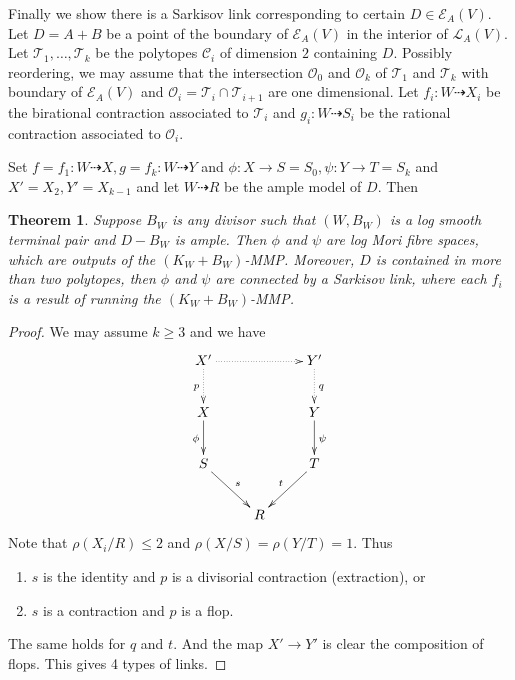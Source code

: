 \documentclass[11pt]{amsart}
\newtheorem{thm}[defn]{Theorem}
\begin{document}
Finally we show there is a Sarkisov link corresponding to certain $D \in \mathcal{E}_{A}(V)$. Let $ D=A+B $ be a point of the boundary of $ \mathcal{E}_A(V) $ in the interior of $ \mathcal{L}_A(V) $. Let $ \mathcal{T}_1, \ldots, \mathcal{T}_k $ be the polytopes $ \mathcal{C}_i $ of dimension $ 2 $ containing $ D $. Possibly reordering, we may assume that  the intersection  $ \mathcal{O}_0 $ and $ \mathcal{O}_k $ of $ \mathcal{T}_1 $ and $ \mathcal{T}_k $ with boundary of $ \mathcal{E}_A(V) $ and  $ \mathcal{O}_i=\mathcal{T}_i\cap\mathcal{T}_{i+1} $ are one dimensional. Let $ f_i:W\dashrightarrow  X_i $ be the birational contraction associated to $ \mathcal{T}_i $ and $ g_i:W\dashrightarrow  S_i $ be the rational contraction associated to $ \mathcal{O}_i $.
\begin{center}
\end{center}

Set $ f=f_1:W\dashrightarrow X, g=f_k:W\dashrightarrow Y $ and $ \phi:X\to S=S_0,\psi:Y\to T=S_k $ and $ X'=X_2,Y'=X_{k-1} $ and let $ W\dashrightarrow R $ be the ample model of $ D $. Then
\begin{thm}\label{constructlink}
  \cite[Theorem 3.7]{haconSarkisovProgram2012} Suppose $ B_W $ is any divisor such that $ (W,B_W) $ is a log smooth terminal pair and $ D-B_W $ is ample. Then $ \phi $ and $ \psi $ are log Mori fibre spaces, which are outputs of the $ (K_W+B_W) $-MMP. Moreover, $ D $ is contained in more than two polytopes, then $\phi$ and $\psi$ are connected by a Sarkisov link, where each $f_{i}$ is a result of running the $(K_{W}+B_{W})$-MMP. 
\end{thm}
\begin{proof}
  We may assume $ k\geqslant 3 $ and we have 
  $$ \xymatrix{
  X'\ar@{.>}[d]_p\ar@{.>}[rr]&&Y'\ar@{.>}[d]^q\\
  X\ar[d]_{\phi}&&Y\ar[d]^\psi\\
  S\ar[rd]^s&&T\ar[ld]_t\\
  &R&} $$
Note that $ \rho(X_i/R)\leqslant 2 $ and $ \rho(X/S)=\rho(Y/T)=1 $. Thus 
\begin{enumerate}
  \item $ s $ is the identity and $ p $ is a divisorial contraction (extraction), or
  \item $ s $ is a contraction and $ p $ is a flop.
\end{enumerate}
The same holds for $ q $ and $ t $. And the map $X'\to Y'$ is clear the composition of flops. This gives 4 types of links.
\end{proof}
\end{document}
